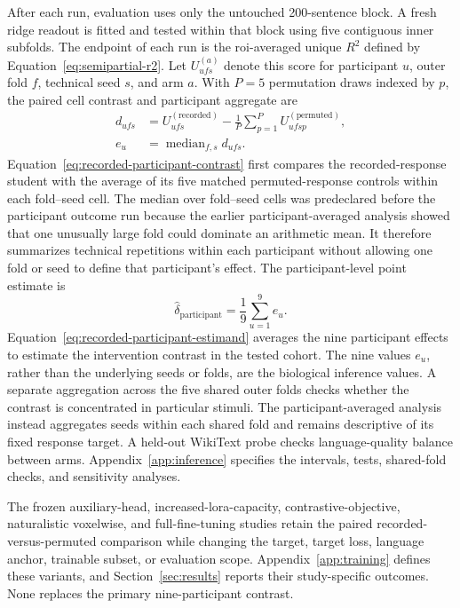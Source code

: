 After each run, evaluation uses only the untouched 200-sentence block.
A fresh ridge readout is fitted and tested within that block using five contiguous inner subfolds.
The endpoint of each run is the \ac{roi}-averaged unique \(R^2\) defined by Equation~\ref{eq:semipartial-r2}.
Let \(U_{ufs}^{(a)}\) denote this score for participant \(u\), outer fold \(f\), technical seed \(s\), and arm \(a\).
With \(P=5\) permutation draws indexed by \(p\), the paired cell contrast and participant aggregate are
\begin{equation}
\begin{aligned}
d_{ufs}
&=
U_{ufs}^{(\mathrm{recorded})}
-
\frac{1}{P}
\sum_{p=1}^{P}
U_{ufsp}^{(\mathrm{permuted})},
\\
e_u
&=
\operatorname{median}_{f,s}d_{ufs}.
\end{aligned}
\label{eq:recorded-participant-contrast}
\end{equation}
Equation~\ref{eq:recorded-participant-contrast} first compares the recorded-response student with the average of its five matched permuted-response controls within each fold--seed cell.
The median over fold--seed cells was predeclared before the participant outcome run because the earlier participant-averaged analysis showed that one unusually large fold could dominate an arithmetic mean.
It therefore summarizes technical repetitions within each participant without allowing one fold or seed to define that participant's effect.
The participant-level point estimate is
\begin{equation}
\widehat{\delta}_{\mathrm{participant}}
=
\frac{1}{9}
\sum_{u=1}^{9}e_u.
\label{eq:recorded-participant-estimand}
\end{equation}
Equation~\ref{eq:recorded-participant-estimand} averages the nine participant effects to estimate the intervention contrast in the tested cohort.
The nine values \(e_u\), rather than the underlying seeds or folds, are the biological inference values.
A separate aggregation across the five shared outer folds checks whether the contrast is concentrated in particular stimuli.
The participant-averaged analysis instead aggregates seeds within each shared fold and remains descriptive of its fixed response target.
A held-out WikiText probe checks language-quality balance between arms.
Appendix~\ref{app:inference} specifies the intervals, tests, shared-fold checks, and sensitivity analyses.

 The frozen auxiliary-head, increased-\ac{lora}-capacity, contrastive-objective, naturalistic voxelwise, and full-fine-tuning studies retain the paired recorded-versus-permuted comparison while changing the target, target loss, language anchor, trainable subset, or evaluation scope.
Appendix~\ref{app:training} defines these variants, and Section~\ref{sec:results} reports their study-specific outcomes.
None replaces the primary nine-participant contrast.

